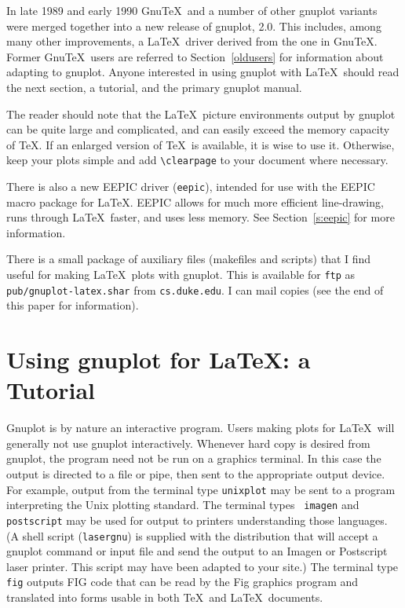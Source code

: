 In late 1989 and early 1990 Gnu\TeX\ and a number of other gnuplot
variants were merged together into a new release of gnuplot, 2.0. This
includes, among many other improvements, a \LaTeX\ driver derived from
the one in Gnu\TeX. Former Gnu\TeX\ users are referred to
Section~\ref{oldusers} for information about adapting to gnuplot.
Anyone interested in using gnuplot with \LaTeX\ should read the next
section, a tutorial, and the primary gnuplot manual.

The reader should note that the \LaTeX\ picture environments output by
gnuplot can be quite large and complicated, and can easily exceed the
memory capacity of \TeX. If an enlarged version of \TeX\ is available,
it is wise to use it. Otherwise, keep your plots simple and add
\verb+\clearpage+ to your document where necessary.

There is also a new EEPIC driver ({\tt eepic}), intended for use with
the EEPIC macro package for \LaTeX. EEPIC allows for much more
efficient line-drawing, runs through \LaTeX\ faster, and uses less
memory.  See Section~\ref{s:eepic} for more information.

There is a small package of auxiliary files (makefiles and scripts)
that I find useful for making \LaTeX\ plots with gnuplot. This is
available for \verb+ftp+ as \verb+pub/gnuplot-latex.shar+ from
\verb+cs.duke.edu+. I can mail copies (see the end of this paper for
information).

\section{Using gnuplot for \LaTeX: a Tutorial}

Gnuplot is by nature an interactive program. Users making plots for
\LaTeX\ will generally not use gnuplot interactively.  Whenever hard
copy is desired from gnuplot, the program need not be run on a
graphics terminal. In this case the output is directed to a file or
pipe, then sent to the appropriate output device. For example, output
from the terminal type {\tt unixplot} may be sent to a program
interpreting the Unix plotting standard. The terminal types {\tt
imagen} and {\tt postscript} may be used for output to printers
understanding those languages. (A shell script ({\tt lasergnu}) is
supplied with the distribution that will accept a gnuplot command or
input file and send the output to an Imagen or Postscript laser
printer. This script may have been adapted to your site.) The terminal
type {\tt fig} outputs FIG code that can be read by the Fig graphics
program and translated into forms usable in both \TeX\ and
\LaTeX\ documents.


